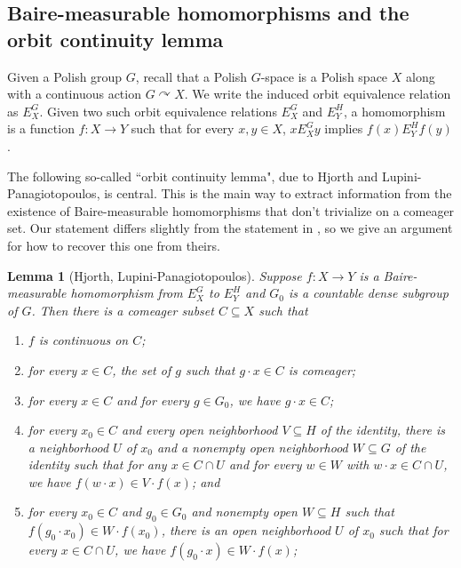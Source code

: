 \documentclass[12pt]{amsart}
\theoremstyle{plain}
\newtheorem{lemma}[theorem]{Lemma}
\theoremstyle{definition}
\begin{document}
\subsection{Baire-measurable homomorphisms and the orbit continuity lemma}

Given a Polish group $G$, recall that a Polish $G$-space is a Polish space $X$ along with a continuous action $G \curvearrowright X$. We write the induced orbit equivalence relation as $E^G_X$. Given two such orbit equivalence relations $E^G_X$ and $E^H_Y$, a homomorphism is a function $f : X \rightarrow Y$ such that for every $x, y \in X$, $x \mathrel{E^G_X} y$ implies $f(x) \mathrel{E^H_Y} f(y)$. 

The following so-called ``orbit continuity lemma", due to Hjorth and Lupini-Panagiotopoulos, is central. 
This is the main way to extract information from the existence of Baire-measurable homomorphisms that don't trivialize on a comeager set.
Our statement differs slightly from the statement in \cite{LupiniPanagio2018}, so we give an argument for how to recover this one from theirs.

\begin{lemma}[Hjorth, Lupini-Panagiotopoulos]\label{lem:orbit_continuity}
Suppose $f : X \rightarrow Y$ is a Baire-measurable homomorphism from $E^G_X$ to $E^H_Y$ and $G_0$ is a countable dense subgroup of $G$. Then there is a comeager subset $C \subseteq X$ such that
\begin{enumerate}
    \item $f$ is continuous on $C$;
    \item for every $x \in C$, the set of $g$ such that $g \cdot x \in C$ is comeager;
    \item for every $x \in C$ and for every $g \in G_0$, we have $g \cdot x \in C$;
    \item for every $x_0 \in C$ and every open neighborhood $V \subseteq H$ of the identity, there is a neighborhood $U$ of $x_0$ and a nonempty open neighborhood $W \subseteq G$ of the identity such that for any $x \in C \cap U$ and for every $w \in W$ with $w \cdot x \in C \cap U$, we have $f(w \cdot x) \in V \cdot f(x)$; and
    \item for every $x_0 \in C$ and $g_0 \in G_0$ and nonempty open $W \subseteq H$ such that $f(g_0 \cdot x_0) \in W \cdot f(x_0)$, there is an open neighborhood $U$ of $x_0$ such that for every $x \in C \cap U$, we have $f(g_0 \cdot x) \in W \cdot f(x)$;
\end{enumerate}
\end{lemma}
\end{document}
